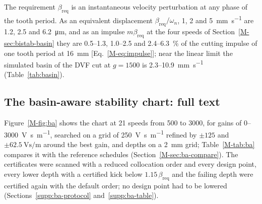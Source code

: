 The requirement $\beta_{\mathrm{req}}$ is an instantaneous velocity perturbation at any phase of the tooth period. As an equivalent displacement $\beta_{\mathrm{req}}/\omega_n$, 1, 2 and \SI{5}{\milli\metre\per\second} are 1.2, 2.5 and \SI{6.2}{\micro\metre}, and as an impulse $m\beta_{\mathrm{req}}$ at the four speeds of Section~\ref{M-sec:bistab-basin} they are 0.5--1.3, 1.0--2.5 and 2.4--\SI{6.3}{\percent} of the cutting impulse of one tooth period at \SI{16}{\milli\metre} [Eq.~\eqref{M-eq:impulse}]; near the linear limit the simulated basin of the DVF cut at $g=1500$ is 2.3--\SI{10.9}{\milli\metre\per\second} (Table~\ref{tab:basin}).

\subsection{The basin-aware stability chart: full text}\label{supp:std-ba-chart}

Figure~\ref{M-fig:ba} shows the chart at 21 speeds from 500 to \SI{3000}{\rpm}, for gains of 0--\SI{3000}{\volt\second\per\metre}, searched on a grid of \SI{250}{\volt\second\per\metre} refined by $\pm125$ and $\pm\SI{62.5}{\volt\second\per\metre}$ around the best gain, and depths on a \SI{2}{\milli\metre} grid; Table~\ref{M-tab:ba} compares it with the reference schedules (Section~\ref{M-sec:ba-compare}). The certificates were scanned with a reduced collocation order and every design point, every lower depth with a certified kick below $1.15\,\beta_{\mathrm{req}}$ and the failing depth were certified again with the default order; no design point had to be lowered (Sections~\ref{supp:ba-protocol} and~\ref{supp:ba-table}).

